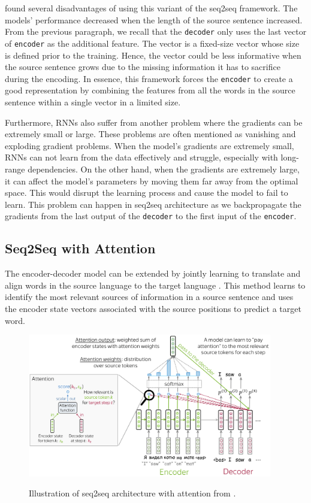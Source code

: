  found several disadvantages of using this variant of the seq2seq framework. The models' performance decreased when the length of the source sentence increased. From the previous paragraph, we recall that the \texttt{decoder} only uses the last vector of \texttt{encoder} as the additional feature.
The vector is a fixed-size vector whose size is defined prior to the training. Hence, the vector could be less informative when the source sentence grows due to the missing information it has to sacrifice during the encoding. In essence, this framework forces the \texttt{encoder} to create a good representation by combining the features from all the words in the source sentence within a single vector in a limited size.

Furthermore, RNNs also suffer from another problem where the gradients can be extremely small or large. These problems are often mentioned as vanishing and exploding gradient problems. When the model's gradients are extremely small, RNNs can not learn from the data effectively and struggle, especially with long-range dependencies. On the other hand, when the gradients are extremely large, it can affect the model's parameters by moving them far away from the optimal space. This would disrupt the learning process and cause the model to fail to learn. This problem can happen in seq2seq architecture as we backpropagate the gradients from the last output of the \texttt{decoder} to the first input of the \texttt{encoder}.

\subsection{Seq2Seq with Attention}
The encoder-decoder model can be extended by jointly learning to translate and align words in the source language to the target language . This method learns to identify the most relevant sources of information in a source sentence and uses the encoder state vectors associated with the source positions to predict a target word.

\begin{figure}[h]
    {\includegraphics[width=0.95\textwidth]{img/attseq2seq.png}}
    \centering
    \caption{Illustration of seq2seq architecture with attention from .}
    \label{img:attseq2seq}
\end{figure}

